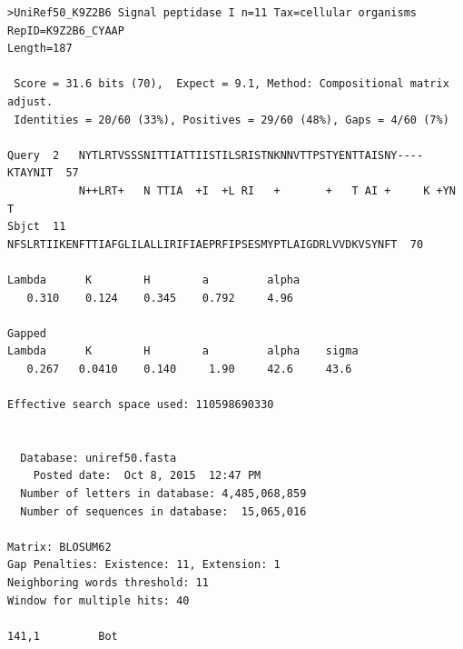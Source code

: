 \documentclass{article}
\begin{document}
\begin{itemize}
\begin{verbatim}
>UniRef50_K9Z2B6 Signal peptidase I n=11 Tax=cellular organisms RepID=K9Z2B6_CYAAP
Length=187

 Score = 31.6 bits (70),  Expect = 9.1, Method: Compositional matrix adjust.
 Identities = 20/60 (33%), Positives = 29/60 (48%), Gaps = 4/60 (7%)

Query  2   NYTLRTVSSSNITTIATTIISTILSRISTNKNNVTTPSTYENTTAISNY----KTAYNIT  57
           N++LRT+   N TTIA  +I  +L RI   +       +   T AI +     K +YN T
Sbjct  11  NFSLRTIIKENFTTIAFGLILALLIRIFIAEPRFIPSESMYPTLAIGDRLVVDKVSYNFT  70

Lambda      K        H        a         alpha
   0.310    0.124    0.345    0.792     4.96

Gapped
Lambda      K        H        a         alpha    sigma
   0.267   0.0410    0.140     1.90     42.6     43.6

Effective search space used: 110598690330


  Database: uniref50.fasta
    Posted date:  Oct 8, 2015  12:47 PM
  Number of letters in database: 4,485,068,859
  Number of sequences in database:  15,065,016

Matrix: BLOSUM62
Gap Penalties: Existence: 11, Extension: 1
Neighboring words threshold: 11
Window for multiple hits: 40                                                         
                                                                                        141,1         Bot
\end{verbatim}
\normalsize
\end{itemize}
\end{document}
